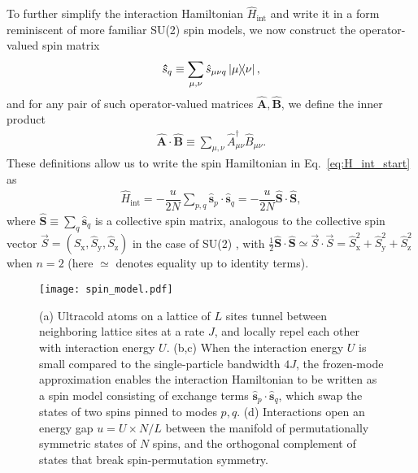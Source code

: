 \documentclass[aps,pra,nofootinbib,twocolumn,superscriptaddress]{revtex4-2}
\renewcommand{\t}{\text} %
\newcommand{\f}[2]{\dfrac{#1}{#2}} %
\newcommand{\1}{\mathds{1}}
\newcommand{\s}{\hat{s}}
\renewcommand{\H}{\hat{H}}
\renewcommand{\S}{\hat{S}}
\newcommand{\x}{\text{x}}
\newcommand{\y}{\text{y}}
\newcommand{\z}{\text{z}}
\begin{document}
To further simplify the interaction Hamiltonian $\H_{\t{int}}$ and write it in a form reminiscent of more familiar SU(2) spin models, we now construct the operator-valued spin matrix
\begin{align}
  \bm\s_q \equiv \sum_{\mu,\nu} \s_{\mu\nu q} \op{\mu}{\nu},
\end{align}
and for any pair of such operator-valued matrices $\bm{\hat{A}},\bm{\hat{B}}$, we define the inner product
\begin{align}
  \bm{\hat{A}} \cdot \bm{\hat{B}}
  \equiv \sum_{\mu,\nu} \hat{A}_{\mu\nu}^\dag \hat{B}_{\mu\nu}.
  \label{eq:dot_product}
\end{align}
These definitions allow us to write the spin Hamiltonian in Eq.~\eqref{eq:H_int_start} as
\begin{align}
  \H_{\t{int}} = -\f{u}{2N} \sum_{p,q} \bm\s_p\cdot\bm\s_q
  = -\f{u}{2N}\bm\S\cdot\bm\S,
  \label{eq:H_int}
\end{align}
where $\bm\S\equiv\sum_q\bm\s_q$ is a collective spin matrix, analogous to the collective spin vector $\vec S=(\S_\x,\S_\y,\S_\z)$ in the case of SU(2) \cite{he2019engineering}, with $\frac12\bm\S\cdot\bm\S \simeq \vec S\cdot\vec S = \S_\x^2 + \S_\y^2 + \S_\z^2$ when $n=2$ (here $\simeq$ denotes equality up to identity terms).

\begin{figure}
\centering
\texttt{[image: spin\_model.pdf]}
\caption{
(a) Ultracold atoms on a lattice of $L$ sites tunnel between neighboring lattice sites at a rate $J$, and locally repel each other with interaction energy $U$.
(b,c) When the interaction energy $U$ is small compared to the single-particle bandwidth $4J$, the frozen-mode approximation enables the interaction Hamiltonian to be written as a spin model consisting of exchange terms $\bm\s_p\cdot\bm\s_q$, which swap the states of two spins pinned to modes $p,q$.
(d) Interactions open an energy gap $u=U\times N/L$ between the manifold of permutationally symmetric states of $N$ spins, and the orthogonal complement of states that break spin-permutation symmetry.
}
\label{fig:spin_model}
\end{figure}
\end{document}
